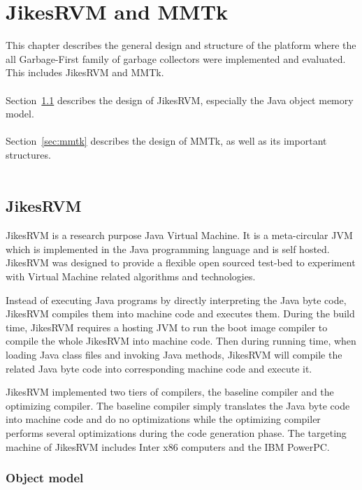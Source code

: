\chapter{JikesRVM and MMTk}
\label{cha:platform}

This chapter describes the general design and structure of the platform where the all Garbage-First
family of garbage collectors were implemented and evaluated. This includes JikesRVM
and MMTk.
\\\\
Section~\ref{sec:jikesrvm} describes the design of JikesRVM, especially the Java object memory model.
\\\\
Section~\ref{sec:mmtk} describes the design of MMTk, as well as its important structures.
\\\\

\section{JikesRVM}
\label{sec:jikesrvm}

JikesRVM is a research purpose Java Virtual Machine. It is a meta-circular JVM
which is implemented in the Java programming language and is self hosted.
JikesRVM was designed to provide a flexible open sourced test-bed to
experiment with Virtual Machine related algorithms and technologies.

Instead of executing Java programs by directly interpreting the Java byte code,
JikesRVM compiles them into machine code and executes them.
During the build time, JikesRVM requires a hosting JVM to run the boot image compiler
to compile the whole JikesRVM into machine code.
Then during running time, when loading Java class files and invoking Java methods,
JikesRVM will compile the related Java byte code into corresponding machine code and execute it.

JikesRVM implemented two tiers of compilers, the baseline compiler and the optimizing compiler.
The baseline compiler simply translates the Java byte code into machine code and do no
optimizations while the optimizing compiler performs several optimizations during the
code generation phase. The targeting machine of JikesRVM includes Inter x86 computers
and the IBM PowerPC.

\subsection{Object model}


